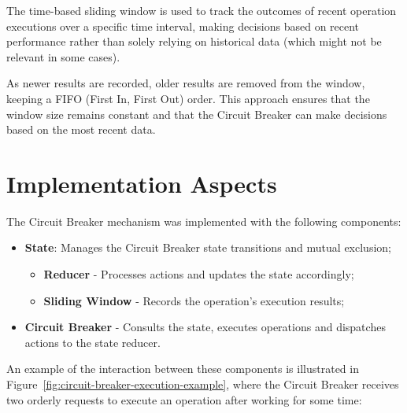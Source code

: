 The time-based sliding window is used
to track the outcomes of recent operation executions over a specific time interval,
making decisions based on recent performance rather than solely relying on historical data
(which might not be relevant in some cases).

As newer results are recorded, older results are removed from the window, keeping a
FIFO (First In, First Out) order.
This approach ensures that the window size remains constant and that the Circuit Breaker can make decisions based on the most recent data.


\section{Implementation Aspects}\label{sec:cbreaker-implementation-aspects}

The Circuit Breaker mechanism was implemented with the following components:

\begin{itemize}
    \item \textbf{State}: Manages the Circuit Breaker state transitions and mutual exclusion;
    \begin{itemize}
        \item \textbf{Reducer} - Processes actions and updates the state accordingly;
        \item \textbf{Sliding Window} - Records the operation's execution results;
    \end{itemize}
    \item \textbf{Circuit Breaker} - Consults the state, executes operations and dispatches actions to the state reducer.
\end{itemize}

An example of the interaction between these components is illustrated in Figure~\ref{fig:circuit-breaker-execution-example},
where the Circuit Breaker receives two orderly requests to execute an operation after working for some time:

